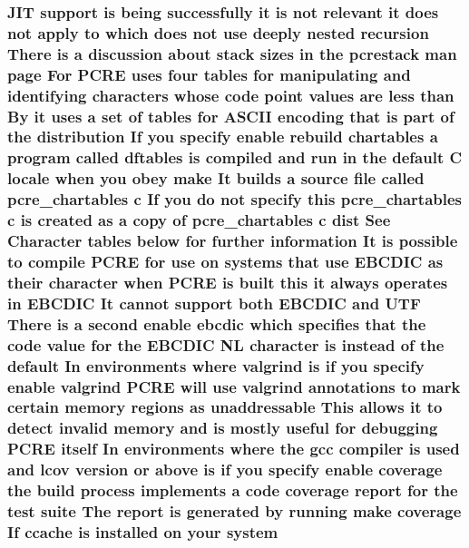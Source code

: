 \subsubsection[{\texorpdfstring{system}{system}}]{ J\+IT {\bf support} {\bf is} being successfully {\bf it} {\bf is} {\bf not} relevant {\bf it} does {\bf not} apply {\bf to} {\bf which} does {\bf not} use deeply nested {\bf recursion} There {\bf is} {\bf a} discussion about {\bf stack} sizes {\bf in} the pcrestack {\bf man} page For {\bf P\+C\+RE} uses four {\bf tables} for manipulating and identifying {\bf characters} whose {\bf code} {\bf point} {\bf values} {\bf are} less {\bf than} By {\bf it} uses {\bf a} {\bf set} {\bf of} {\bf tables} for {\bf A\+S\+C\+II} {\bf encoding} that {\bf is} part {\bf of} the distribution If you specify enable rebuild {\bf chartables} {\bf a} {\bf program} called {\bf dftables} {\bf is} {\bf compiled} and {\bf run} {\bf in} the {\bf default} {\bf C} {\bf locale} when you obey {\bf make} It builds {\bf a} {\bf source} {\bf file} called pcre\+\_\+chartables {\bf c} If you {\bf do} {\bf not} specify {\bf this} pcre\+\_\+chartables {\bf c} {\bf is} created {\bf as} {\bf a} copy {\bf of} pcre\+\_\+chartables {\bf c} {\bf dist} See Character {\bf tables} {\bf below} for further information It {\bf is} {\bf possible} {\bf to} {\bf compile} {\bf P\+C\+RE} for use {\bf on} {\bf systems} that use E\+B\+C\+D\+IC {\bf as} their {\bf character} when {\bf P\+C\+RE} {\bf is} {\bf built} {\bf this} {\bf it} always operates {\bf in} E\+B\+C\+D\+IC It cannot {\bf support} both E\+B\+C\+D\+IC and U\+TF There {\bf is} {\bf a} {\bf second} enable ebcdic {\bf which} specifies that the {\bf code} {\bf value} for the E\+B\+C\+D\+IC {\bf NL} {\bf character} {\bf is} instead {\bf of} the {\bf default} In {\bf environments} {\bf where} valgrind {\bf is} {\bf if} you specify enable valgrind {\bf P\+C\+RE} will use valgrind annotations {\bf to} {\bf mark} certain {\bf memory} regions {\bf as} unaddressable This allows {\bf it} {\bf to} detect invalid {\bf memory} and {\bf is} mostly useful for debugging {\bf P\+C\+RE} {\bf itself} In {\bf environments} {\bf where} the {\bf gcc} {\bf compiler} {\bf is} {\bf used} and lcov version {\bf or} {\bf above} {\bf is} {\bf if} you specify enable coverage the build {\bf process} implements {\bf a} {\bf code} coverage report for the test suite The report {\bf is} {\bf generated} by running {\bf make} coverage If ccache {\bf is} {\bf installed} {\bf on} your system}\hypertarget{README_8txt_a2ef3475084e8c047fae1d0f5be26ff00}{}\label{README_8txt_a2ef3475084e8c047fae1d0f5be26ff00}
